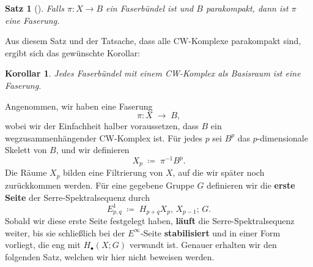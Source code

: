 \documentclass[12pt]{article}
\numberwithin{conj}{section}
\newtheorem{theorem}[conj]{Satz}
\newtheorem{corollary}[conj]{Korollar}
\begin{document}
    \begin{theorem}[{\cite[Theorem 1]{huebsch1955}}]
        Falls $\pi : X \to B$ ein Faserbündel ist und $B$ parakompakt, dann ist
        $\pi$ eine Faserung.
    \end{theorem}

    \noindent
    Aus diesem Satz und der Tatsache, dass alle CW-Komplexe parakompakt sind, ergibt
    sich das gewünschte Korollar:

    \begin{corollary}
        Jedes Faserbündel mit einem CW-Komplex als Basisraum ist eine Faserung.
    \end{corollary}

    \noindent
    Angenommen, wir haben eine Faserung
    \[
        \pi: X \;\longrightarrow\; B,
    \]
    wobei wir der Einfachheit halber voraussetzen, dass $B$ ein
    wegzusammenhängender CW-Komplex ist. Für jedes $p$ sei $B^{p}$ das $p$-dimensionale
    Skelett von $B$, und wir definieren
    \[
        X_{p} \;\coloneqq\; \pi^{-1} B^{p} .
    \]
    Die Räume $X_{p}$ bilden eine Filtrierung von $X$, auf die wir später noch zurückkommen
    werden. Für eine gegebene Gruppe $G$ definieren wir die \textbf{erste Seite} der
    Serre-Spektralsequenz durch
    \[
        E^{1}_{p,q}\;\coloneqq\; H_{p+q} X_{p},\,X_{p-1};\,G .
    \]
    Sobald wir diese erste Seite festgelegt haben, \textbf{läuft} die Serre-Spektralsequenz
    weiter, bis sie schließlich bei der $E^{\infty}$-Seite \textbf{stabilisiert} und
    in einer Form vorliegt, die eng mit $H_{\bullet}(X;G)$ verwandt ist. Genauer erhalten
    wir den folgenden Satz, welchen wir hier nicht beweisen werden.
\end{document}

